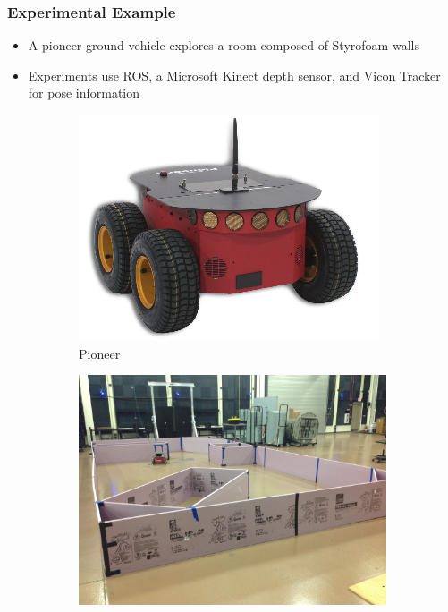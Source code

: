 \documentclass[11pt,professionalfonts,hyperref={pdftex,pdfpagemode=none,pdfstartview=FitH}]{beamer}
\begin{document}
\begin{frame}
\frametitle{Experimental Example}
\begin{itemize}
        	\item A pioneer ground vehicle explores a room composed of Styrofoam walls
	\item Experiments use ROS, a Microsoft Kinect depth sensor, and Vicon Tracker for pose information
\end{itemize}
\begin{figure}
	\centering
    	\begin{subfigure}[b]{0.28\textwidth}
        		\includegraphics[width=\textwidth]{pioneer.png}
        		\caption*{Pioneer}
    	\end{subfigure}    	
	\hspace*{0.04\textwidth}
	\begin{subfigure}[b]{0.28\textwidth}
        		\includegraphics[width=\textwidth]{test_setup_1.jpg}

\end{subfigure}
\end{figure}
\end{frame}
\end{document}

